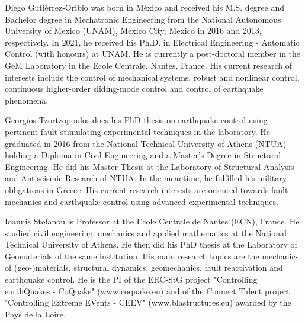 \documentclass[journal,twoside,web]{ieeecolor}
\begin{document}



\begin{IEEEbiography}{Diego Guti\'errez-Oribio} was born in M\'exico and received his M.S. degree and Bachelor degree in Mechatronic Engineering from the National Autonomous University of Mexico (UNAM), Mexico City, Mexico in 2016 and 2013, respectively. In 2021, he received his Ph.D. in Electrical Engineering - Automatic Control (with honours) at UNAM. He is currently a post-doctoral member in the GeM Laboratory in the Ecole Centrale, Nantes, France. His current research of interests include the control of mechanical systems, robust and nonlinear control, continuous higher-order sliding-mode control and control of earthquake phenomena.
\end{IEEEbiography}

\begin{IEEEbiography}{Georgios Tzortzopoulos} does his PhD thesis on earthquake control using pertinent fault stimulating experimental techniques in the laboratory. He graduated in 2016 from the National Technical University of Athens (NTUA) holding a Diploma in Civil Engineering and a Master’s Degree in Structural Engineering. He did his Master Thesis at the Laboratory of Structural Analysis and Antiseismic Research of NTUA. In the meantime, he fulfilled his military obligations in Greece. His current research interests are oriented towards fault mechanics and earthquake control using advanced experimental techniques.
\end{IEEEbiography}

\begin{IEEEbiography}{Ioannis Stefanou} is Professor at the Ecole Centrale de Nantes (ECN), France. He studied civil engineering, mechanics and applied mathematics at the National Technical University of Athens. He then did his PhD thesis at the Laboratory of Geomaterials of the same institution. His main research topics are the mechanics of (geo-)materials, structural dynamics, geomechanics, fault reactivation and earthquake control. He is the PI of the ERC-StG project "Controlling earthQuakes - CoQuake" (www.coquake.eu) and of the Connect Talent project "Controlling Extreme EVents - CEEV" (www.blastructures.eu) awarded by the Pays de la Loire.
\end{IEEEbiography}
\end{document}
